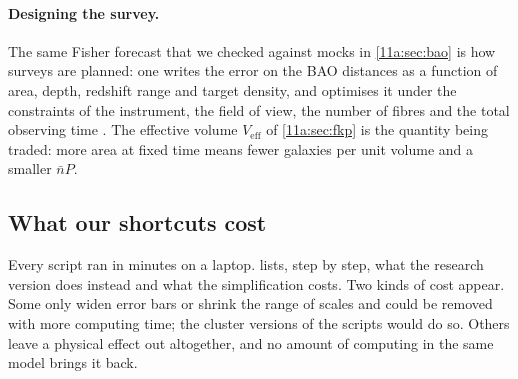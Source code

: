 \paragraph{Designing the survey.}
The same Fisher forecast that we checked against mocks in \cref{11a:sec:bao} is
how surveys are planned: one writes the error on the BAO distances as a function
of area, depth, redshift range and target density, and optimises it under the
constraints of the instrument, the field of view, the number of fibres and the
total observing time . The effective volume
$V_{\mathrm{eff}}$ of \cref{11a:sec:fkp} is the quantity being traded: more area
at fixed time means fewer galaxies per unit volume and a smaller $\bar nP$.

\subsection{What our shortcuts cost}
\label{11a:sec:research-nerfs}

Every script ran in minutes on a laptop. 
lists, step by step, what the research version does instead and what the
simplification costs. Two kinds of cost appear. Some only widen error bars or
shrink the range of scales and could be removed with more computing time; the
cluster versions of the scripts would do so. Others leave a physical effect out
altogether, and no amount of computing in the same model brings it back.

